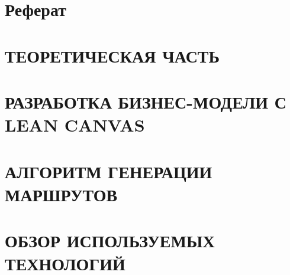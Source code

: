 \documentclass[a4paper,14pt,russian]{extreport}
\begin{document}
    
    \chapter*{Реферат}
    
    \newpage
    
    \tableofcontents
    \newpage
    
%    
%    
%    
    
    
    
    \chapter{ТЕОРЕТИЧЕСКАЯ ЧАСТЬ}
    
    
    \chapter{РАЗРАБОТКА БИЗНЕС-МОДЕЛИ С LEAN CANVAS}
    
    
    \chapter{АЛГОРИТМ ГЕНЕРАЦИИ МАРШРУТОВ}
    
    
    \chapter{ОБЗОР ИСПОЛЬЗУЕМЫХ ТЕХНОЛОГИЙ}
    
    
\end{document}
